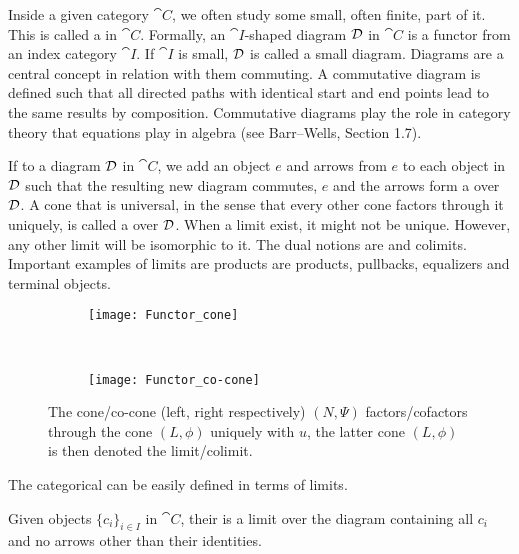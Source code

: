 \documentclass[../../main.tex]{subfiles}
\begin{document}
    Inside a given category $\cat{C}$, we often study some small, often finite, part of it. This is called a  in $\cat{C}$. Formally, an $\cat{I}$-shaped diagram $\mathcal{D}$ in $\cat{C}$ is a functor from an index category $\cat{I}$. If $\cat{I}$ is small, $\mathcal{D}$ is called a small diagram. Diagrams are a central concept in relation with them commuting. A commutative diagram is defined such that all directed paths with identical start and end points lead to the same results by composition. Commutative diagrams play the role in category theory that equations play in algebra (see Barr–Wells, Section 1.7).%
    
    If to a diagram $\mathcal{D}$ in $\cat{C}$, we add an object $e$ and arrows from $e$ to each object in $\mathcal{D}$ such that the resulting new diagram commutes, $e$ and the arrows form a  over $\mathcal{D}$. A cone that is universal, in the sense that every other cone factors through it uniquely, is called a  over $\mathcal{D}$. When a limit exist, it might not be unique. However, any other limit will be isomorphic to it. The dual notions are  and colimits. Important examples of limits are products are products, pullbacks, equalizers and terminal objects.
    
    \begin{figure}[H]
        \centering
        \begin{subfigure}[b]{0.5\textwidth}
            \centering
            \texttt{[image: Functor\_cone]}
            \caption{}
        \end{subfigure}%
        ~ 
        \begin{subfigure}[b]{0.5\textwidth}
            \centering
            \texttt{[image: Functor\_co-cone]}
            \caption{}
        \end{subfigure}
        \caption{The cone/co-cone (left, right respectively) $(N,\Psi)$ factors/cofactors through the cone $(L,\phi)$ uniquely with $u$, the latter cone $(L,\phi)$ is then denoted the limit/colimit.}
    \end{figure}
    
    The categorical  can be easily defined in terms of limits. 
    
    \begin{definition}
        Given objects $\{c_i\}_{i \in I}$ in $\cat{C}$, their  is a limit over the diagram containing all $c_i$ and no arrows other than their identities.
    \end{definition}
    
\end{document}
